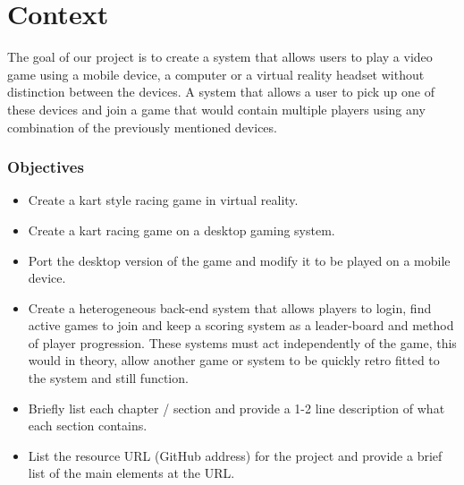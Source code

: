 
\chapter{Context}
The goal of our project is to create a system that allows users to play a video game using a mobile device, a computer or a virtual reality headset without distinction between the devices. A system that allows a user to pick up one of these devices and join a game that would contain multiple players using any combination of the previously mentioned devices.\newline

\subsection{Objectives}
\begin{itemize}
\item Create a kart style racing game in virtual reality.
\item Create a kart racing game on a desktop gaming system.
\item Port the desktop version of the game and modify it to be played on a mobile device.
\item Create a heterogeneous back-end system that allows players to login, find active games to join and keep a scoring system as a leader-board and method of player progression. These systems must act independently of the game, this would in theory, allow another game or system to be quickly retro fitted to the system and still function.
\item Briefly list each chapter / section and provide a 1-2 line description of what each section contains.
\item List the resource URL (GitHub address) for the project and provide a brief list of the main elements at the URL.
\end{itemize}